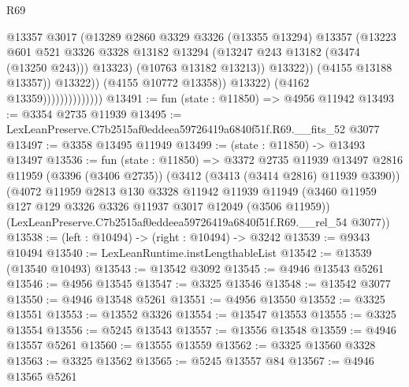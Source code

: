 \begin{lexlean}{R69}
\begin{coremodule}
                                            @13357
                                            @3017
                                            (@13289
                                              @2860
                                              @3329
                                              @3326
                                              (@13355 @13294)
                                              @13357
                                              (@13223
                                                @601
                                                @521
                                                @3326
                                                @3328
                                                @13182
                                                @13294
                                                (@13247 @243 @13182 (@3474 (@13250 @243)))
                                                @13323)
                                              (@10763 @13182 @13213))
                                            @13322))
                                        (@4155 @13188 @13357))
                                      @13322))
                                  (@4155 @10772 @13358))
                                @13322)
                              (@4162 @13359))))))))))))))
@13491 := fun (state : @11850) => @4956 @11942
@13493 := @3354 @2735 @11939
@13495 := LexLeanPreserve.C7b2515af0eddeea59726419a6840f51f.R69.__fits_52 @3077
@13497 := @3358 @13495 @11949
@13499 := (state : @11850) -> @13493 @13497
@13536 := fun (state : @11850) =>
  @3372
    @2735
    @11939
    @13497
    @2816
    @11959
    (@3396 (@3406 @2735))
    (@3412 (@3413 (@3414 @2816) @11939 @3390))
    (@4072
      @11959
      @2813
      @130
      @3328
      @11942
      @11939
      @11949
      (@3460 @11959 @127 @129 @3326 @3326 @11937 @3017 @12049 (@3506 @11959))
      (LexLeanPreserve.C7b2515af0eddeea59726419a6840f51f.R69.__rel_54 @3077))
@13538 := (left : @10494) -> (right : @10494) -> @3242
@13539 := @9343 @10494
@13540 := LexLeanRuntime.instLengthableList
@13542 := @13539 (@13540 @10493)
@13543 := @13542 @3092
@13545 := @4946 @13543 @5261
@13546 := @4956 @13545
@13547 := @3325 @13546
@13548 := @13542 @3077
@13550 := @4946 @13548 @5261
@13551 := @4956 @13550
@13552 := @3325 @13551
@13553 := @13552 @3326
@13554 := @13547 @13553
@13555 := @3325 @13554
@13556 := @5245 @13543
@13557 := @13556 @13548
@13559 := @4946 @13557 @5261
@13560 := @13555 @13559
@13562 := @3325 @13560 @3328
@13563 := @3325 @13562
@13565 := @5245 @13557 @84
@13567 := @4946 @13565 @5261

\end{coremodule}
\end{lexlean}
